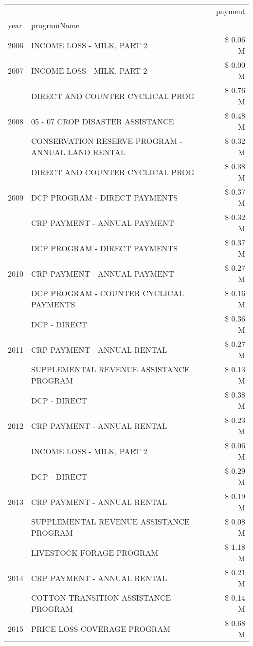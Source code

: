 \begin{tabular}{llr}
\toprule
 &  & payment \\
year & programName &  \\
\midrule
2006 & INCOME LOSS - MILK, PART 2 & \$ 0.06 M \\
\cline{1-3}
2007 & INCOME LOSS - MILK, PART 2 & \$ 0.00 M \\
\cline{1-3}
\multirow[t]{3}{*}{2008} & DIRECT AND COUNTER CYCLICAL PROG & \$ 0.76 M \\
 & 05 - 07 CROP DISASTER ASSISTANCE & \$ 0.48 M \\
 & CONSERVATION RESERVE PROGRAM - ANNUAL LAND RENTAL & \$ 0.32 M \\
\cline{1-3}
\multirow[t]{3}{*}{2009} & DIRECT AND COUNTER CYCLICAL PROG & \$ 0.38 M \\
 & DCP PROGRAM - DIRECT PAYMENTS & \$ 0.37 M \\
 & CRP PAYMENT - ANNUAL PAYMENT & \$ 0.32 M \\
\cline{1-3}
\multirow[t]{3}{*}{2010} & DCP PROGRAM - DIRECT PAYMENTS & \$ 0.37 M \\
 & CRP PAYMENT - ANNUAL PAYMENT & \$ 0.27 M \\
 & DCP PROGRAM - COUNTER CYCLICAL PAYMENTS & \$ 0.16 M \\
\cline{1-3}
\multirow[t]{3}{*}{2011} & DCP - DIRECT & \$ 0.36 M \\
 & CRP PAYMENT - ANNUAL RENTAL & \$ 0.27 M \\
 & SUPPLEMENTAL REVENUE ASSISTANCE PROGRAM & \$ 0.13 M \\
\cline{1-3}
\multirow[t]{3}{*}{2012} & DCP - DIRECT & \$ 0.38 M \\
 & CRP PAYMENT - ANNUAL RENTAL & \$ 0.23 M \\
 & INCOME LOSS - MILK, PART 2 & \$ 0.06 M \\
\cline{1-3}
\multirow[t]{3}{*}{2013} & DCP - DIRECT & \$ 0.29 M \\
 & CRP PAYMENT - ANNUAL RENTAL & \$ 0.19 M \\
 & SUPPLEMENTAL REVENUE ASSISTANCE PROGRAM & \$ 0.08 M \\
\cline{1-3}
\multirow[t]{3}{*}{2014} & LIVESTOCK FORAGE PROGRAM & \$ 1.18 M \\
 & CRP PAYMENT - ANNUAL RENTAL & \$ 0.21 M \\
 & COTTON TRANSITION ASSISTANCE PROGRAM & \$ 0.14 M \\
\cline{1-3}
\multirow[t]{3}{*}{2015} & PRICE LOSS COVERAGE PROGRAM & \$ 0.68 M \\

\end{tabular}
